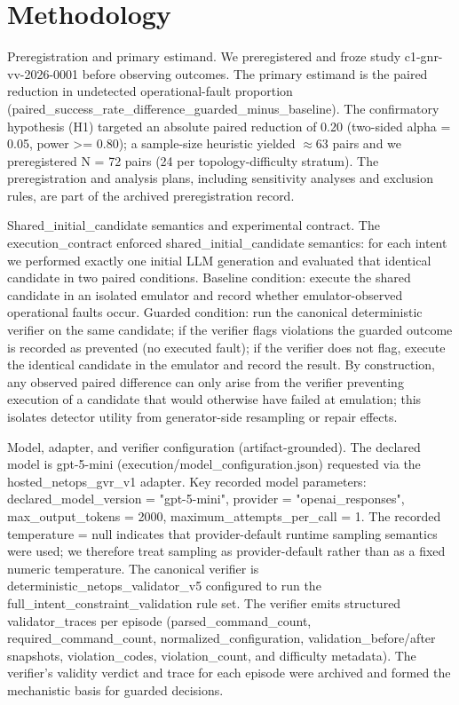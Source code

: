 \documentclass[conference]{IEEEtran}
\begin{document}
\section{Methodology}
Preregistration and primary estimand. We preregistered and froze study c1-gnr-vv-2026-0001 before observing outcomes. The primary estimand is the paired reduction in undetected operational-fault proportion (paired\_success\_rate\_difference\_guarded\_minus\_baseline). The confirmatory hypothesis (H1) targeted an absolute paired reduction of 0.20 (two-sided alpha = 0.05, power >= 0.80); a sample-size heuristic yielded \ensuremath{\approx}63 pairs and we preregistered N = 72 pairs (24 per topology-difficulty stratum). The preregistration and analysis plans, including sensitivity analyses and exclusion rules, are part of the archived preregistration record.

Shared\_initial\_candidate semantics and experimental contract. The execution\_contract enforced shared\_initial\_candidate semantics: for each intent we performed exactly one initial LLM generation and evaluated that identical candidate in two paired conditions. Baseline condition: execute the shared candidate in an isolated emulator and record whether emulator-observed operational faults occur. Guarded condition: run the canonical deterministic verifier on the same candidate; if the verifier flags violations the guarded outcome is recorded as prevented (no executed fault); if the verifier does not flag, execute the identical candidate in the emulator and record the result. By construction, any observed paired difference can only arise from the verifier preventing execution of a candidate that would otherwise have failed at emulation; this isolates detector utility from generator-side resampling or repair effects.

Model, adapter, and verifier configuration (artifact-grounded). The declared model is gpt-5-mini (execution/model\_configuration.json) requested via the hosted\_netops\_gvr\_v1 adapter. Key recorded model parameters: declared\_model\_version = "gpt-5-mini", provider = "openai\_responses", max\_output\_tokens = 2000, maximum\_attempts\_per\_call = 1. The recorded temperature = null indicates that provider-default runtime sampling semantics were used; we therefore treat sampling as provider-default rather than as a fixed numeric temperature. The canonical verifier is deterministic\_netops\_validator\_v5 configured to run the full\_intent\_constraint\_validation rule set. The verifier emits structured validator\_traces per episode (parsed\_command\_count, required\_command\_count, normalized\_configuration, validation\_before/after snapshots, violation\_codes, violation\_count, and difficulty metadata). The verifier's validity verdict and trace for each episode were archived and formed the mechanistic basis for guarded decisions.
\end{document}
